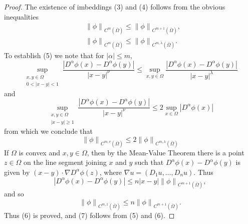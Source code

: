 \begin{proof}
  The existence of imbeddings (3) and (4) follows from the obvious inequalities
  \[
  \begin{aligned}
  & \left\|\phi\right\|_{C^m(\overline{\Omega})} \leq\left\|\phi\right\|_{C^{m+1}(\overline{\Omega})}, \\
  & \left\|\phi\right\|_{C^m(\overline{\Omega})} \leq\left\|\phi\right\|_{C^{m, \lambda}(\overline{\Omega})} .
  \end{aligned}
  \]
  To establish (5) we note that for $|\alpha| \leq m$,
  \[
  \sup_{\substack{x, y \in \Omega \\ 0<|x-y|<1}}
  \frac{\left|D^\alpha \phi(x)-D^\alpha \phi(y)\right|}{|x-y|^\nu}
  \leq \sup _{x, y \in \Omega} \frac{\left|D^\alpha \phi(x)-D^\alpha \phi(y)\right|}{|x-y|^\lambda}
  \]
  and
  \[
    \sup_{\substack{x, y\in \Omega \\ |x-y| \geq 1}}
    \frac{\left|D^\alpha \phi(x)-D^\alpha \phi(y)\right|}{|x-y|^\nu}
    \leq 2 \sup _{x \in \Omega}\left|D^\alpha \phi(x)\right|
  \]
  from which we conclude that
  \[
  \left\|\phi\right\|_{C^{m, v}(\overline{\Omega})} \leq 2\left\|\phi\right\|_{C^{m, \lambda}(\overline{\Omega})}
  \]
  If $\Omega$ is convex and $x, y \in \Omega$, then by the Mean-Value Theorem there is a point $z \in \Omega$ on the line segment joining $x$ and $y$ such that $D^\alpha \phi(x)-D^\alpha \phi(y)$ is given by $(x-y) \cdot \nabla D^\alpha \phi(z)$, where $\nabla u=\left(D_1 u, \ldots, D_n u\right)$. Thus
  \begin{equation}\label{eq:1.8}
    \left|D^\alpha \phi(x)-D^\alpha \phi(y)\right|
    \leq n|x-y|\left\|\phi\right\|_{C^{m+1}(\overline{\Omega})},
  \end{equation}
  and so
  \[
  \left\|\phi\right\|_{C^{m, 1}(\overline{\Omega})} \leq n\left\|\phi\right\|_{C^{m+1}(\overline{\Omega})}.
  \]
  Thus (6) is proved, and (7) follows from (5) and (6).


\end{proof}
